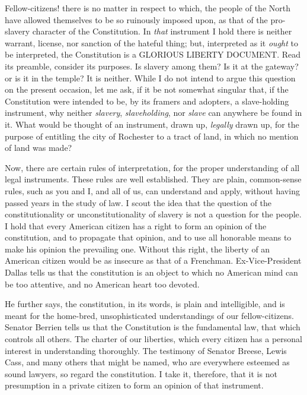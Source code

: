 Fellow-citizens! there is no matter in respect to which, the people of the North have allowed themselves to be so ruinously imposed upon, as that of the pro-slavery character of the Constitution. In \textit{that} instrument I hold there is neither warrant, license, nor sanction of the hateful thing; but, interpreted as it \textit{ought} to be interpreted, the Constitution is a GLORIOUS LIBERTY DOCUMENT. Read its preamble, consider its purposes. Is slavery among them? Is it at the gateway? or is it in the temple? It is neither. While I do not intend to argue this question on the present occasion, let me ask, if it be not somewhat singular that, if the Constitution were intended to be, by its framers and adopters, a slave-holding instrument, why neither \textit{slavery}, \textit{slaveholding}, nor \textit{slave} can anywhere be found in it. What would be thought of an instrument, drawn up, \textit{legally} drawn up, for the purpose of entitling the city of Rochester to a tract of land, in which no mention of land was made?\par

Now, there are certain rules of interpretation, for the proper understanding of all legal instruments. These rules are well established. They are plain, common-sense rules, such as you and I, and all of us, can understand and apply, without having passed years in the study of law. I scout the idea that the question of the constitutionality or unconstitutionality of slavery is not a question for the people. I hold that every American citizen has a right to form an opinion of the constitution, and to propagate that opinion, and to use all honorable means to make his opinion the prevailing one. Without this right, the liberty of an American citizen would be as insecure as that of a Frenchman. Ex-Vice-President Dallas tells us that the constitution is an object to which no American mind can be too attentive, and no American heart too devoted.\par

He further says, the constitution, in its words, is plain and intelligible, and is meant for the home-bred, unsophisticated understandings of our fellow-citizens. Senator Berrien tells us that the Constitution is the fundamental law, that which controls all others. The charter of our liberties, which every citizen has a personal interest in understanding thoroughly. The testimony of Senator Breese, Lewis Cass, and many others that might be named, who are everywhere esteemed as sound lawyers, so regard the constitution. I take it, therefore, that it is not presumption in a private citizen to form an opinion of that instrument.\par


